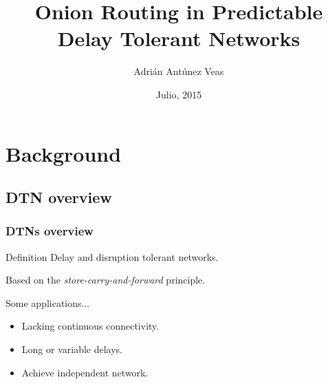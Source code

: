 \documentclass[compress,red]{beamer}
\title{Onion Routing in Predictable \\ Delay Tolerant Networks}
\author{Adrián Antúnez Veas}
\institute{dEIC, Universidad Autónoma de Barcelona}
\date{\scriptsize Julio, 2015}
\begin{document}
\thispagestyle{empty}
\AtBeginSection[]
{
}

\frame{
	\titlepage
}

\section[Index]{}
\frame{\tableofcontents[hideallsubsections]
}

\section{Background}
\subsection{DTN overview}
\begin{frame}
\frametitle{DTNs overview}
\begin{block}{Definition}
Delay and disruption tolerant networks.
\end{block}
\bigskip 
Based on the \alert{\emph{store-carry-and-forward}} principle.\\
\bigskip
\begin{block}{Some applications...}
\begin{itemize}
\item Lacking continuous connectivity.
\item Long or variable delays.
\item Achieve independent network.
\end{itemize}
\end{block}
\end{frame}
\end{document}
